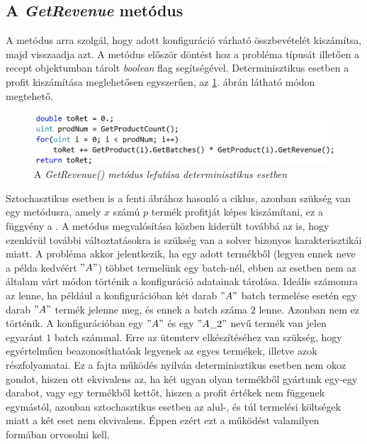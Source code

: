 \subsection{A \textit{GetRevenue} metódus} \label{getRevenue}
A  metódus arra szolgál, hogy adott konfiguráció várható összbevételét kiszámítsa, majd visszaadja azt.
A metódus először döntést hoz a probléma típusát illetően a recept objektumban tárolt \textit{boolean} flag segítségével.
Determinisztikus esetben a profit kiszámítása meglehetősen egyszerűen, az \ref{getRevenueNonStoch}. ábrán látható módon megtehető. 
\begin{figure}[H]
\begin{center}
\includegraphics[scale=0.38]{getRevenueNonStoch}
\caption{A \textit{GetRevenue() metódus lefutása determinisztikus esetben}}
\label{getRevenueNonStoch}
\end{center}
\end{figure}
Sztochasztikus esetben is a fenti ábrához hasonló a ciklus, azonban szükség van egy metódusra, amely $x$ számú $p$ termék profitját képes kiszámítani, ez a függvény a .
A metódus megvalósítása közben kiderült továbbá az is, hogy ezenkívül további változtatásokra is szükség van a solver bizonyos karakterisztikái miatt.
A probléma akkor jelentkezik, ha egy adott termékből (legyen ennek neve a példa kedvéért $"A"$) többet termelünk egy batch-nél, ebben az esetben nem az általam várt módon történik a konfiguráció adatainak tárolása.
Ideális számomra az lenne, ha például a konfigurációban két darab $"A"$ batch termelése esetén egy darab $"A"$ termék jelenne meg, és ennek a batch száma $2$ lenne.
Azonban nem ez történik.
A konfigurációban egy $"A"$ és egy $"A\_2"$ nevű termék van jelen egyaránt $1$ batch számmal.
Erre az ütemterv elkészítéséhez van szükség, hogy egyértelműen beazonosíthatóak legyenek az egyes termékek, illetve azok részfolyamatai.
Ez a fajta működés nyilván determinisztikus esetben nem okoz gondot, hiszen ott ekvivalens az, ha két ugyan olyan termékből gyártunk egy-egy darabot, vagy egy termékből kettőt, hiszen a profit értékek nem függenek egymástól, azonban sztochasztikus esetben az alul-, és túl termelési költségek miatt a két eset nem ekvivalens.
Éppen ezért ezt a működést valamilyen formában orvosolni kell.
